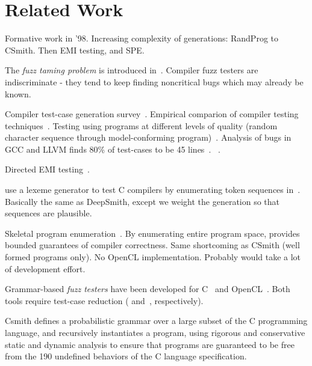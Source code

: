 \section{Related Work}\label{sec:rw}

 Formative work in '98. Increasing complexity of generations: RandProg to CSmith. Then EMI testing, and SPE.

The \emph{fuzz taming problem} is introduced in~\cite{Chen2013}. Compiler fuzz testers are indiscriminate - they tend to keep finding noncritical bugs which may already be known.

 Compiler test-case generation survey~\cite{Boujarwah1997}. Empirical comparion of compiler testing techniques~\cite{Chen2014a}. Testing using programs at different levels of quality (random character sequence through model-conforming program)~\cite{McKeeman1998}. Analysis of bugs in GCC and LLVM finds 80\% of test-cases to be 45 lines~\cite{Sun2016}. ~\cite{Godefroid2008a,Le2015,Sun2016a}.

 Directed EMI testing~\cite{Le2015}.

\citeauthor{McKeeman1998} use a lexeme generator to test C compilers by enumerating token sequences in~\cite{McKeeman1998}. Basically the same as DeepSmith, except we weight the generation so that sequences are plausible.

Skeletal program enumeration~\cite{Zhang2016a}. By enumerating entire program space, provides bounded guarantees of compiler correctness. Same shortcoming as CSmith (well formed programs only). No OpenCL implementation. Probably would take a lot of development effort. 

Grammar-based \emph{fuzz testers} have been developed for C~\cite{Yang2011} and OpenCL~\cite{Lidbury2015a}. Both tools require test-case reduction (\cite{Regehr2012a} and~\cite{Pflanzer2016}, respectively).

Csmith defines a probabilistic grammar over a large subset of the C programming language, and recursively instantiates a program, using rigorous and conservative static and dynamic analysis to ensure that programs are guaranteed to be free from the 190 undefined behaviors of the C language specification.

